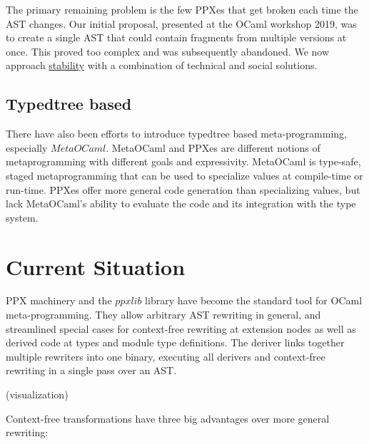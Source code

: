 \documentclass[10pt, a4paper, twocolumn]{article}
\begin{document}
The primary remaining problem is the few PPXes that get broken each time the AST
changes. Our initial proposal, presented at the OCaml workshop
2019\cite{workshop2019}, was to create a single AST that could contain fragments
from multiple versions at once. This proved too complex and was subsequently
abandoned. We now approach \hyperref[stability]{stability} with a combination of
technical and social solutions.

\subsection{Typedtree based}

There have also been efforts to introduce typedtree based meta-programming,
especially $MetaOCaml$\cite{metaocaml}. MetaOCaml and PPXes are different
notions of metaprogramming with different goals and expressivity. MetaOCaml is
type-safe, staged metaprogramming that can be used to specialize values at
compile-time or run-time. PPXes offer more general code generation than
specializing values, but lack MetaOCaml's ability to evaluate the code and its
integration with the type system.

\section{Current Situation}

PPX machinery and the $ppxlib$ library have become the standard tool for OCaml
meta-programming. They allow arbitrary AST rewriting in general, and streamlined
special cases for context-free rewriting at extension nodes as well as derived
code at types and module type definitions. The deriver links together multiple
rewriters into one binary, executing all derivers and context-free rewriting in
a single pass over an AST.

\vspace{20pt}

(visualization)

\vspace{25pt}

Context-free transformations have three big advantages over more general rewriting:
\end{document}
